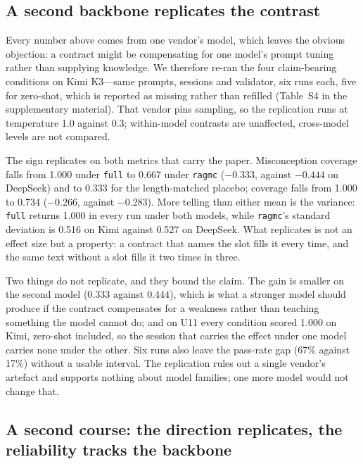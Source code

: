\documentclass[review,12pt]{elsarticle}
\renewcommand{\_}{\kgunderscore\allowbreak}
\newcommand{\id}[1]{\texttt{#1}}
\begin{document}
\subsection{A second backbone replicates the contrast}
\label{sec:second-backbone}

Every number above comes from one vendor's model, which leaves the obvious
objection: a contract might be compensating for one model's prompt tuning rather
than supplying knowledge. We therefore re-ran the four claim-bearing conditions
on Kimi K3---same prompts, sessions and validator, six runs each, five for
zero-shot, which is reported as missing rather than refilled
(Table~S4 in the supplementary material). That vendor pins sampling, so the
replication runs at temperature 1.0 against 0.3; within-model contrasts are
unaffected, cross-model levels are not compared.

The sign replicates on both metrics that carry the paper. Misconception coverage
falls from 1.000 under \id{full} to 0.667 under \id{rag\_mc} ($-0.333$, against
$-0.444$ on DeepSeek) and to 0.333 for the length-matched placebo; coverage falls
from 1.000 to 0.734 ($-0.266$, against $-0.283$). More telling than either mean is
the variance: \id{full} returns 1.000 in every run under both models, while
\id{rag\_mc}'s standard deviation is 0.516 on Kimi against 0.527 on DeepSeek.
What replicates is not an effect size but a property: a contract that
names the slot fills it every time, and the same text without a slot fills it two
times in three.

Two things do not replicate, and they bound the claim. The gain is smaller on the
second model ($0.333$ against $0.444$), which is what a stronger model should
produce if the contract compensates for a weakness rather than teaching something
the model cannot do; and on U11 every condition scored 1.000 on Kimi, zero-shot
included, so the session that carries the effect under one model carries none
under the other. Six runs also leave the pass-rate gap (67\% against 17\%)
without a usable interval. The replication rules out a single vendor's
artefact and supports nothing about model families; one more model would not
change that.


\subsection{A second course: the direction replicates, the reliability tracks the backbone}
\label{sec:second-course}
\end{document}
